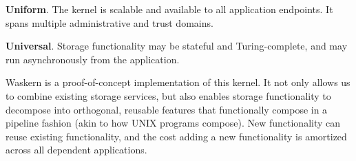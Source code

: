 \textbf{Uniform}.  The kernel is scalable and available to all
application endpoints. It spans multiple administrative and trust
domains.

\textbf{Universal}.  Storage functionality may be stateful and
Turing-complete, and may run asynchronously from the application.

Waskern is a proof-of-concept implementation of this kernel. It not only
allows us to combine existing storage services, but also enables storage
functionality to decompose into orthogonal, reusable features that
functionally compose in a pipeline fashion (akin to how UNIX programs
compose).  New functionality can reuse existing functionality, and the
cost adding a new functionality is amortized across all dependent applications.

